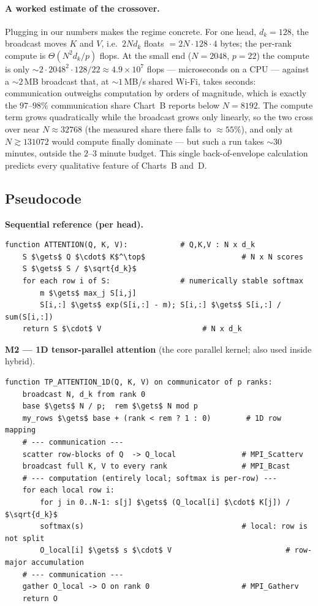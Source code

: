 \documentclass[11pt,a4paper]{article}
\begin{document}
\paragraph{A worked estimate of the crossover.} Plugging in our numbers makes the
regime concrete. For one head, $d_k=128$, the broadcast moves $K$ and $V$, i.e.\
$2Nd_k$ floats $=2N\!\cdot\!128\!\cdot\!4$ bytes; the per-rank compute is
$\Theta(N^2 d_k/p)$ flops. At the small end ($N=2048$, $p=22$) the compute is only
$\sim\!2{\cdot}2048^2{\cdot}128/22\approx4.9\times10^{7}$ flops --- microseconds on a
CPU --- against a $\sim\!2$\,MB broadcast that, at $\sim\!1$\,MB/s shared Wi-Fi,
takes seconds: communication outweighs computation by orders of magnitude, which is
exactly the $97$--$98\%$ communication share Chart~B reports below $N=8192$. The
compute term grows quadratically while the broadcast grows only linearly, so the two
cross over near $N\approx32768$ (the measured share there falls to $\approx\!55\%$),
and only at $N\gtrsim131072$ would compute finally dominate --- but such a run takes
$\sim\!30$ minutes, outside the $2$--$3$ minute budget. This single back-of-envelope
calculation predicts every qualitative feature of Charts~B and~D.

\subsection{Pseudocode}
\label{sec:pseudo}

\noindent\textbf{Sequential reference (per head).}
\begin{lstlisting}
function ATTENTION(Q, K, V):            # Q,K,V : N x d_k
    S $\gets$ Q $\cdot$ K$^\top$                      # N x N scores
    S $\gets$ S / $\sqrt{d_k}$
    for each row i of S:                # numerically stable softmax
        m $\gets$ max_j S[i,j]
        S[i,:] $\gets$ exp(S[i,:] - m); S[i,:] $\gets$ S[i,:] / sum(S[i,:])
    return S $\cdot$ V                       # N x d_k
\end{lstlisting}

\noindent\textbf{M2 --- 1D tensor-parallel attention} (the core parallel kernel;
also used inside hybrid).
\begin{lstlisting}
function TP_ATTENTION_1D(Q, K, V) on communicator of p ranks:
    broadcast N, d_k from rank 0
    base $\gets$ N / p;  rem $\gets$ N mod p
    my_rows $\gets$ base + (rank < rem ? 1 : 0)        # 1D row mapping
    # --- communication ---
    scatter row-blocks of Q  -> Q_local               # MPI_Scatterv
    broadcast full K, V to every rank                 # MPI_Bcast
    # --- computation (entirely local; softmax is per-row) ---
    for each local row i:
        for j in 0..N-1: s[j] $\gets$ (Q_local[i] $\cdot$ K[j]) / $\sqrt{d_k}$
        softmax(s)                                    # local: row is not split
        O_local[i] $\gets$ s $\cdot$ V                          # row-major accumulation
    # --- communication ---
    gather O_local -> O on rank 0                     # MPI_Gatherv
    return O
\end{lstlisting}
\end{document}

